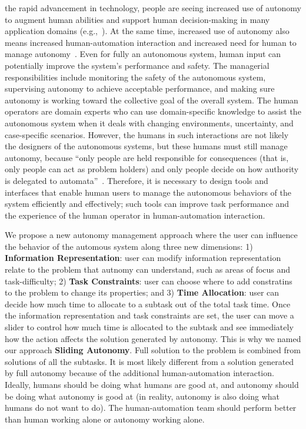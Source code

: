 \documentclass[journal]{IEEEtran}
\begin{document}
 the rapid advancement in technology, people are seeing increased use of autonomy to augment human abilities and support human decision-making in many application domains (e.g.,~\cite{Chun2010Limousine,Casper2003Human,Lin2010Supporting,Robins2009From}). At the same time, increased use of autonomy also means increased human-automation interaction and increased need for human to manage autonomy~\cite{Bainbridge1983Ironies}. Even for fully an autonomous system, human input can potentially improve the system's performance and safety. The managerial responsibilities include monitoring the safety of the autonomous system, supervising autonomy to achieve acceptable performance, and making sure autonomy is working toward the collective goal of the overall system. The human operators are domain experts who can use domain-specific knowledge to assist the autonomous system when it deals with changing environments, uncertainty, and case-specific scenarios. However, the humans in such interactions are not likely the designers of the autonomous systems, but these humans must still manage autonomy, because ``only people are held responsible for consequences (that is, only people can act as problem holders) and only people decide on how authority is delegated to automata''~\cite{Woods2006Joint,Bradshaw2013Seven}. Therefore, it is necessary to design tools and interfaces that enable human users to manage the autonomous behaviors of the system efficiently and effectively; such tools can improve task performance and the experience of the human operator in human-automation interaction.

We propose a new autonomy management approach where the user can influence the behavior of the automous system along three new dimensions: 1) \textbf{Information Representation}: user can modify information representation relate to the problem that autnomy can understand, such as areas of focus and task-difficulty; 2) \textbf{Task Constraints}: user can choose where to add constratins to the problem to change its properties; and 3) \textbf{Time Allocation}: user can decide how much time to allocate to a subtask out of the total task time. Once the information representation and task constraints are set, the user can move a slider to control how much time is allocated to the subtask and see immediately how the action affects the solution generated by autonomy. This is why we named our approach \textbf{Sliding Autonomy}. Full solution to the problem is combined from solutions of all the subtasks. It is most likely different from a solution generated by full autonomy because of the additional human-automation interaction. Ideally, humans should be doing what humans are good at, and autonomy should be doing what autonomy is good at (in reality, autonomy is also doing what humans do not want to do). The human-automation team should perform better than human working alone or autonomy working alone.
\end{document}
